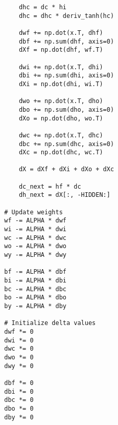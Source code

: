 \documentclass{article}
\begin{document}
\begin{lstlisting}
            dhc = dc * hi
            dhc = dhc * deriv_tanh(hc)

            dwf += np.dot(x.T, dhf)
            dbf += np.sum(dhf, axis=0)
            dXf = np.dot(dhf, wf.T)

            dwi += np.dot(x.T, dhi)
            dbi += np.sum(dhi, axis=0)
            dXi = np.dot(dhi, wi.T)

            dwo += np.dot(x.T, dho)
            dbo += np.sum(dho, axis=0)
            dXo = np.dot(dho, wo.T)

            dwc += np.dot(x.T, dhc)
            dbc += np.sum(dhc, axis=0)
            dXc = np.dot(dhc, wc.T)

            dX = dXf + dXi + dXo + dXc

            dc_next = hf * dc
            dh_next = dX[:, -HIDDEN:]

        # Update weights
        wf -= ALPHA * dwf
        wi -= ALPHA * dwi
        wc -= ALPHA * dwc
        wo -= ALPHA * dwo
        wy -= ALPHA * dwy

        bf -= ALPHA * dbf
        bi -= ALPHA * dbi
        bc -= ALPHA * dbc
        bo -= ALPHA * dbo
        by -= ALPHA * dby

        # Initialize delta values
        dwf *= 0
        dwi *= 0
        dwc *= 0
        dwo *= 0
        dwy *= 0

        dbf *= 0
        dbi *= 0
        dbc *= 0
        dbo *= 0
        dby *= 0




\end{lstlisting}

\clearpage
\end{document}
